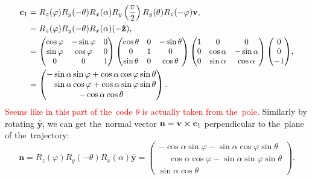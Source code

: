 				\begin{equation}
					\begin{aligned}
						\mathbf{c}_1 &= R_z(\varphi)R_y(-\theta)R_x(\alpha)R_y\left(\frac{\pi}{2}\right)R_y(\theta)R_z(-\varphi)\mathbf{v},\\
						&= R_z(\varphi)R_y(-\theta)R_x(\alpha)(-\mathbf{\hat{z}}),\\
						&= \scalebox{0.95}{$
								\begin{pmatrix}
									\cos\varphi & -\sin\varphi & 0\\
									\sin\varphi & \cos\varphi & 0\\
									0 & 0 & 1
								\end{pmatrix}
								\begin{pmatrix}
									\cos\theta & 0 & -\sin\theta\\
									0 & 1 & 0\\
									\sin\theta & 0 & \cos\theta
								\end{pmatrix}
								\begin{pmatrix}
									1 & 0 & 0\\
									0 & \cos\alpha & -\sin\alpha\\
									0 & \sin\alpha & \cos\alpha
								\end{pmatrix}
								\begin{pmatrix}
									0\\ 0\\ -1
								\end{pmatrix}
							$},\\
						&= 	\begin{pmatrix}
								-\sin\alpha\sin\varphi+\cos\alpha\cos\varphi\sin\theta\\
								\phantom{-}\sin\alpha\cos\varphi+\cos\alpha\sin\varphi\sin\theta\\
								-\cos\alpha\cos\theta
							\end{pmatrix}.
					\end{aligned}
				\end{equation}
			\textcolor{red}{Seems like in this part of the~code $\theta$ is actually taken from the~pole.} Similarly by rotating $\mathbf{\hat{y}}$, we can get the~normal vector $\mathbf{n}=\mathbf{v}\cross\mathbf{c}_1$ perpendicular to the~plane of the~trajectory:
				\begin{equation}
					\mathbf{n} = R_z(\varphi)R_y(-\theta)R_x(\alpha)\mathbf{\hat{y}}=
									\begin{pmatrix}
										-\cos\alpha\sin\varphi-\sin\alpha\cos\varphi\sin\theta\\
										\phantom{-}\cos\alpha\cos\varphi-\sin\alpha\sin\varphi\sin\theta\\
										\sin\alpha\cos\theta
									\end{pmatrix}.
				\end{equation}

